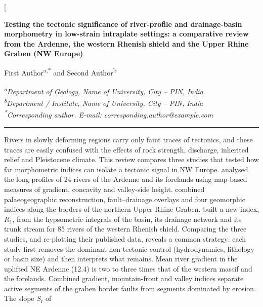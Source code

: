 \documentclass[10pt,a4paper,twocolumn]{article}
\makeatletter
\newcommand{\AuthorOne}{First Author}
\newcommand{\AuthorTwo}{Second Author}
\newcommand{\AffilOne}{Department of Geology, Name of University, City -- PIN, India}
\newcommand{\AffilTwo}{Department / Institute, Name of University, City -- PIN, India}
\newcommand{\CorrEmail}{corresponding.author@example.com}
\newcommand{\permil}{\textperthousand}
\makeatother
\begin{document}
\twocolumn[{%
\thispagestyle{first}
\begin{center}
{\bfseries\fontsize{16}{20}\selectfont
Testing the tectonic significance of river-profile and drainage-basin morphometry in
low-strain intraplate settings: a comparative review from the Ardenne, the western Rhenish
shield and the Upper Rhine Graben (NW Europe)\par}
\vspace{10pt}
{\fontsize{11}{13}\selectfont \AuthorOne\textsuperscript{a,*} and \AuthorTwo\textsuperscript{b}\par}
\vspace{6pt}
{\footnotesize\itshape
\textsuperscript{a}\AffilOne\\
\textsuperscript{b}\AffilTwo\\
\textsuperscript{*}Corresponding author. E-mail: \CorrEmail\par}
\end{center}
\vspace{6pt}
\noindent\rule{\textwidth}{0.8pt}\par\vspace{5pt}
\par\vspace{3pt}
{\small\noindent
Rivers in slowly deforming regions carry only faint traces of tectonics, and these traces are
easily confused with the effects of rock strength, discharge, inherited relief and Pleistocene
climate. This review compares three studies that tested how far morphometric indices can isolate a
tectonic signal in NW Europe. \citet{Demoulin1998} analysed the long profiles of 24 rivers of the Ardenne and its forelands using map-based measures of gradient, concavity and valley-side height.
\citet{PetersVanBalen2007} combined palaeogeographic reconstruction, fault--drainage overlays and
four geomorphic indices along the borders of the northern Upper Rhine Graben.
\citet{Demoulin2011} built a new index, $R_1$, from the hypsometric integrals of the basin, its
drainage network and its trunk stream for 85 rivers of the western Rhenish shield. Comparing the three studies, and re-plotting their published data, reveals a common strategy: each study first removes the dominant non-tectonic control
(hydrodynamics, lithology or basin size) and then interprets what remains. Mean river gradient in the
uplifted NE Ardenne (12.4\permil) is two to three times that of the western massif and the
forelands. Combined gradient, mountain-front and valley indices separate active segments of the graben border faults from segments dominated by erosion. The slope $S_\mathrm{r}$ of
}}
\end{document}
